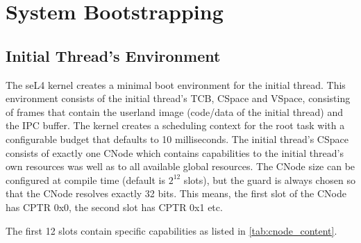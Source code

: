 %
%
%
%

\chapter{\label{ch:bootup}System Bootstrapping}

\section{Initial Thread's Environment}

The seL4 kernel creates a minimal boot environment for the initial thread.
This environment consists of the initial thread's TCB, CSpace and VSpace,
consisting of frames that contain the userland image (code/data of the initial
thread) and the IPC buffer.
The kernel creates a scheduling context for the root task with a configurable budget that defaults to 10 milliseconds. 
The initial thread's CSpace consists of exactly one CNode
which contains capabilities to the initial
thread's own resources was well as to all available global resources.
The CNode size can be configured at compile time (default is $2^{12}$
slots), but the guard is always chosen so that the CNode resolves exactly
32 bits. This means, the first slot of the CNode has CPTR 0x0, the
second slot has CPTR 0x1 etc.

The first 12 slots contain specific capabilities as listed in
\autoref{tab:cnode_content}.

